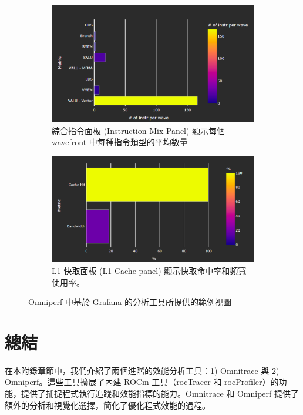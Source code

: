 \begin{figure}
    \centering
    \begin{subfigure}[b]{\textwidth}
        \centering
        \includegraphics[width=0.5\linewidth]{Appendici/InstructionMixPanel.png}
        \caption{綜合指令面板 (Instruction Mix Panel) 顯示每個 wavefront 中每種指令類型的平均數量}
        \label{fig:instruction-mix-panel}
    \end{subfigure}

    \begin{subfigure}[b]{\textwidth}
        \centering
        \includegraphics[width=0.5\linewidth]{Appendici/L1CachePanel.png}
        \caption{L1 快取面板 (L1 Cache panel) 顯示快取命中率和頻寬使用率。}
        \label{fig:l1-cache-panel}
    \end{subfigure}

    \caption{Omniperf 中基於 Grafana 的分析工具所提供的範例視圖}
    
\end{figure}

\section{總結}
在本附錄章節中，我們介紹了兩個進階的效能分析工具：1) Omnitrace 與 2) Omniperf。這些工具擴展了內建 ROCm 工具（rocTracer 和 rocProfiler）的功能，提供了捕捉程式執行追蹤和效能指標的能力。Omnitrace 和 Omniperf 提供了額外的分析和視覺化選擇，簡化了優化程式效能的過程。
